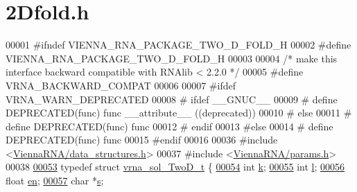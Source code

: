 \hypertarget{2Dfold_8h_source}{}\section{2\+Dfold.h}
\label{2Dfold_8h_source}

\begin{DoxyCode}
00001 \textcolor{preprocessor}{#ifndef VIENNA\_RNA\_PACKAGE\_TWO\_D\_FOLD\_H}
00002 \textcolor{preprocessor}{#define VIENNA\_RNA\_PACKAGE\_TWO\_D\_FOLD\_H}
00003 
00004 \textcolor{comment}{/* make this interface backward compatible with RNAlib < 2.2.0 */}
00005 \textcolor{preprocessor}{#define VRNA\_BACKWARD\_COMPAT}
00006 
00007 \textcolor{preprocessor}{#ifdef VRNA\_WARN\_DEPRECATED}
00008 \textcolor{preprocessor}{# ifdef \_\_GNUC\_\_}
00009 \textcolor{preprocessor}{#  define DEPRECATED(func) func \_\_attribute\_\_ ((deprecated))}
00010 \textcolor{preprocessor}{# else}
00011 \textcolor{preprocessor}{#  define DEPRECATED(func) func}
00012 \textcolor{preprocessor}{# endif}
00013 \textcolor{preprocessor}{#else}
00014 \textcolor{preprocessor}{# define DEPRECATED(func) func}
00015 \textcolor{preprocessor}{#endif}
00016 
00036 \textcolor{preprocessor}{#include <\hyperlink{data__structures_8h}{ViennaRNA/data\_structures.h}>}
00037 \textcolor{preprocessor}{#include <\hyperlink{params_8h}{ViennaRNA/params.h}>}
00038 
\hyperlink{group__kl__neighborhood__mfe}{00053} \textcolor{keyword}{typedef} \textcolor{keyword}{struct }\hyperlink{group__kl__neighborhood__mfe_structvrna__sol__TwoD__t}{vrna\_sol\_TwoD\_t} \{
\hyperlink{group__kl__neighborhood__mfe_ac111e850bb3b3a11b6b5707912cfa1b8}{00054}   \textcolor{keywordtype}{int}   \hyperlink{group__kl__neighborhood__mfe_ac111e850bb3b3a11b6b5707912cfa1b8}{k};        
\hyperlink{group__kl__neighborhood__mfe_ab8e95cd920901175a2cc8de726ab1d36}{00055}   \textcolor{keywordtype}{int}   \hyperlink{group__kl__neighborhood__mfe_ab8e95cd920901175a2cc8de726ab1d36}{l};        
\hyperlink{group__kl__neighborhood__mfe_a7577863a6a84224dfee39b321c03cab1}{00056}   \textcolor{keywordtype}{float} \hyperlink{group__kl__neighborhood__mfe_a7577863a6a84224dfee39b321c03cab1}{en};       
\hyperlink{group__kl__neighborhood__mfe_ac5942d2505a6cd7e4a8073a321d5d2d5}{00057}   \textcolor{keywordtype}{char}  *\hyperlink{group__kl__neighborhood__mfe_ac5942d2505a6cd7e4a8073a321d5d2d5}{s};       

\end{DoxyCode}
